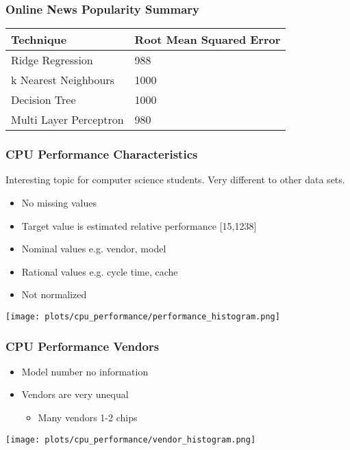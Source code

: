 \documentclass[aspectratio=169]{beamer}
\begin{document}
\begin{frame}{}
\frametitle{Online News Popularity Summary}
\begin{table}[]
\begin{tabular}{ll}
\hline
\textbf{Technique}     & \textbf{Root Mean Squared Error} \\ \hline
Ridge Regression       &                   988               \\
k Nearest Neighbours   &                 1000                 \\
Decision Tree          &                        1000          \\
Multi Layer Perceptron &             980                     \\ \hline
\end{tabular}
\end{table}
\end{frame}

\begin{frame}{}
\frametitle{CPU Performance Characteristics}
Interesting topic for computer science students. Very different to other data sets.
\begin{minipage}{0.3\textwidth}
\begin{itemize}
\item No missing values
\item Target value is estimated relative performance [15,1238]
\item Nominal values e.g. vendor, model
\item Rational values e.g. cycle time, cache
\item Not normalized
\end{itemize}
\end{minipage}
\begin{minipage}{0.69\textwidth}
    \texttt{[image: plots/cpu\_performance/performance\_histogram.png]}
\end{minipage}
\end{frame}

\begin{frame}{}
\frametitle{CPU Performance Vendors}
\begin{minipage}{0.3\textwidth}
\begin{itemize}
\item Model number no information
\item Vendors are very unequal
\begin{itemize}
	\item Many vendors 1-2 chips
\end{itemize}
\end{itemize}
\end{minipage}
\begin{minipage}{0.69\textwidth}
    \texttt{[image: plots/cpu\_performance/vendor\_histogram.png]}
\end{minipage}
\end{frame}
\end{document}
